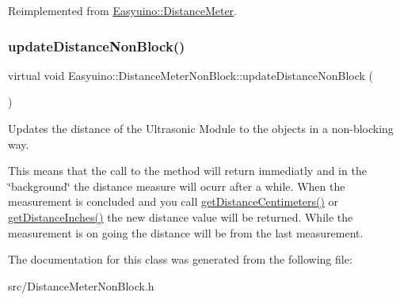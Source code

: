 Reimplemented from \hyperlink{class_easyuino_1_1_distance_meter_a739197578f06b58faedefd0526d49499}{Easyuino\+::\+Distance\+Meter}.

\mbox{\label{class_easyuino_1_1_distance_meter_non_block_ac7163baab744f1393bab3841de0170d4}} 
\subsubsection{\texorpdfstring{update\+Distance\+Non\+Block()}{updateDistanceNonBlock()}}
{\footnotesize\ttfamily virtual void Easyuino\+::\+Distance\+Meter\+Non\+Block\+::update\+Distance\+Non\+Block (\begin{DoxyParamCaption}{ }\end{DoxyParamCaption})\hspace{0.3cm}{\ttfamily [virtual]}}



Updates the distance of the Ultrasonic Module to the objects in a non-\/blocking way. 

This means that the call to the method will return immediatly and in the \char`\"{}background\char`\"{} the distance measure will ocurr after a while. When the measurement is concluded and you call \hyperlink{class_easyuino_1_1_distance_meter_non_block_a00419fc2c2ff7c587735063971aa7464}{get\+Distance\+Centimeters()} or \hyperlink{class_easyuino_1_1_distance_meter_a4e3c650c54382d9af6bca51dcac4e7a3}{get\+Distance\+Inches()} the new distance value will be returned. While the measurement is on going the distance will be from the last measurement. 

The documentation for this class was generated from the following file\+:\begin{DoxyCompactItemize}
\item 
src/Distance\+Meter\+Non\+Block.\+h\end{DoxyCompactItemize}
